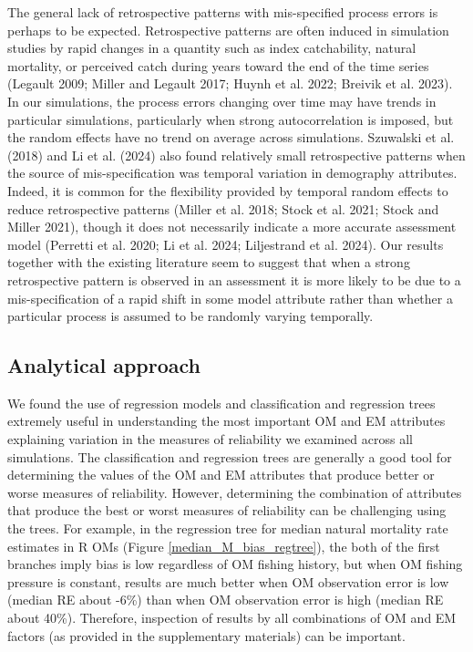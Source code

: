 \documentclass[
  12pt,
]{article}
\begin{document}
The general lack of retrospective patterns with mis-specified process
errors is perhaps to be expected. Retrospective patterns are often
induced in simulation studies by rapid changes in a quantity such as
index catchability, natural mortality, or perceived catch during years
toward the end of the time series (Legault 2009; Miller and Legault
2017; Huynh et al. 2022; Breivik et al. 2023). In our simulations, the
process errors changing over time may have trends in particular
simulations, particularly when strong autocorrelation is imposed, but
the random effects have no trend on average across simulations.
Szuwalski et al. (2018) and Li et al. (2024) also found relatively small
retrospective patterns when the source of mis-specification was temporal
variation in demography attributes. Indeed, it is common for the
flexibility provided by temporal random effects to reduce retrospective
patterns (Miller et al. 2018; Stock et al. 2021; Stock and Miller 2021),
though it does not necessarily indicate a more accurate assessment model
(Perretti et al. 2020; Li et al. 2024; Liljestrand et al. 2024). Our
results together with the existing literature seem to suggest that when
a strong retrospective pattern is observed in an assessment it is more
likely to be due to a mis-specification of a rapid shift in some model
attribute rather than whether a particular process is assumed to be
randomly varying temporally.

\subsection*{Analytical approach}\label{analytical-approach}

We found the use of regression models and classification and regression
trees extremely useful in understanding the most important OM and EM
attributes explaining variation in the measures of reliability we
examined across all simulations. The classification and regression trees
are generally a good tool for determining the values of the OM and EM
attributes that produce better or worse measures of reliability.
However, determining the combination of attributes that produce the best
or worst measures of reliability can be challenging using the trees. For
example, in the regression tree for median natural mortality rate
estimates in R OMs (Figure \ref{median_M_bias_regtree}), the both of the
first branches imply bias is low regardless of OM fishing history, but
when OM fishing pressure is constant, results are much better when OM
observation error is low (median RE about -6\%) than when OM observation
error is high (median RE about 40\%). Therefore, inspection of results
by all combinations of OM and EM factors (as provided in the
supplementary materials) can be important.
\end{document}
